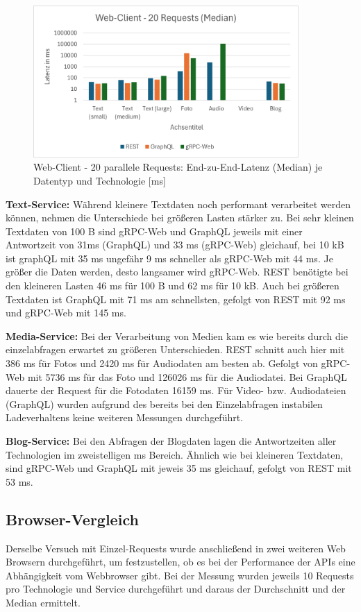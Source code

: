 \begin{figure}[htbp]
	\centering
	\includegraphics[width=0.9\textwidth]{images/Parallelrequests.png}
	\caption{Web-Client - 20 parallele Requests: End-zu-End-Latenz (Median) je Datentyp und Technologie [ms]}
	\label{fig:webclient-20req-median}
\end{figure}

\textbf{Text-Service:}  
Während kleinere Textdaten noch performant verarbeitet werden können, nehmen die Unterschiede bei größeren Lasten stärker zu. Bei sehr kleinen Textdaten von 100 B sind gRPC-Web und GraphQL jeweils mit einer Antwortzeit von 31ms (GraphQL) und 33 ms (gRPC-Web) gleichauf, bei 10 kB ist graphQL mit 35 ms ungefähr 9 ms schneller als gRPC-Web mit 44 ms. Je größer die Daten werden, desto langsamer wird gRPC-Web. REST benötigte bei den kleineren Lasten 46 ms für 100 B und 62 ms für 10 kB. Auch bei größeren Textdaten ist GraphQL mit 71 ms am schnellsten, gefolgt von REST mit 92 ms und gRPC-Web mit 145 ms. 

\textbf{Media-Service:}  
Bei der Verarbeitung von Medien kam es wie bereits durch die einzelabfragen erwartet zu größeren Unterschieden. REST schnitt auch hier mit 386 ms für Fotos und 2420 ms für Audiodaten am besten ab. Gefolgt von gRPC-Web mit 5736 ms für das Foto und 126026 ms für die Audiodatei. Bei GraphQL dauerte der Request für die Fotodaten 16159 ms.
Für Video- bzw. Audiodateien (GraphQL) wurden aufgrund des bereits bei den Einzelabfragen instabilen Ladeverhaltens keine weiteren Messungen durchgeführt.


\textbf{Blog-Service:}  
Bei den Abfragen der Blogdaten lagen die Antwortzeiten aller Technologien im zweistelligen ms Bereich. Ähnlich wie bei kleineren Textdaten, sind gRPC-Web und GraphQL mit jeweis 35 ms gleichauf, gefolgt von REST mit 53 ms.

\clearpage
\subsection{Browser-Vergleich}
Derselbe Versuch mit Einzel-Requests wurde anschließend in zwei weiteren Web Browsern durchgeführt, um festzustellen, ob es bei der Performance der APIs eine Abhängigkeit vom Webbrowser gibt. 
Bei der Messung wurden jeweils 10 Requests pro Technologie und Service durchgeführt und daraus der Durchschnitt und der Median ermittelt.

